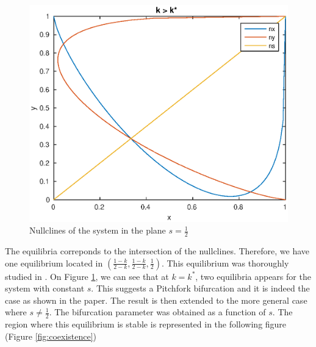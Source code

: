 \documentclass{article}
\begin{document}
\begin{figure}[H]
\includegraphics[scale=0.5]{nullpg.eps}
\caption{Nullclines of the system in the plane $s=\frac{1}{2}$}
\label{fig:nullclines}
\end{figure}

The equilibria correponds to the intersection of the nullclines.
Therefore, we have one equilibrium located in $(\frac{1-k}{2-k}, \frac{1-k}{2-k}, \frac{1}{2})$.
This equilibrium was thoroughly studied in \cite{bilingual}.
On Figure \ref{fig:nullclines}, we can see that at $k=k^{\ast}$, two equilibria appears for the system with constant $s$.
This suggests a Pitchfork bifurcation and it is indeed the case as shown in the paper.
The result is then extended to the more general case where $s \ne \frac{1}{2}$.
The bifurcation parameter was obtained as a function of $s$.
The region where this equilibrium is stable is represented in the following figure (Figure \ref{fig:coexistence})
\end{document}
